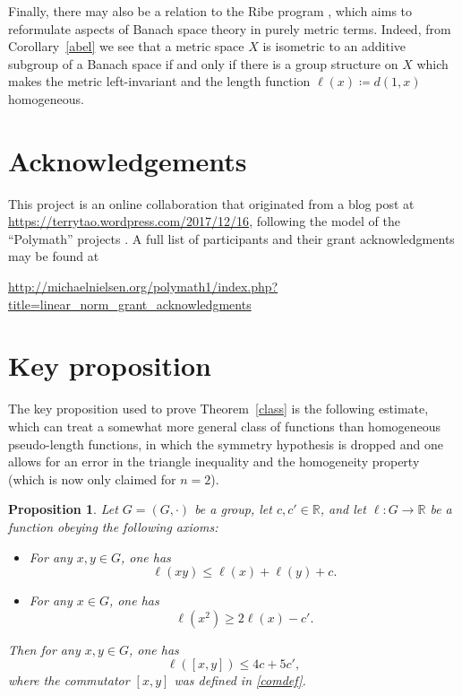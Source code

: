 \documentclass[11pt,a4paper,reqno]{amsart}
\numberwithin{equation}{section}
\theoremstyle{plain}
\newtheorem{proposition}[equation]{Proposition}
\theoremstyle{definition}
\newcommand\R{\mathbb{R}}
\newcommand\normsymb{\ell}  %
\newcommand\norm[1]{\ell({#1})}   %
\begin{document}
Finally, there may also be a relation to the Ribe program \cite{Naor},
which aims to reformulate aspects of Banach space theory in purely metric
terms. Indeed, from Corollary~\ref{abel} we see that a metric space $X$
is isometric to an additive subgroup of a Banach space if and only if
there is a group structure on $X$ which makes the metric left-invariant
and the length function $\norm{ x } \coloneqq d(1,x)$ homogeneous.


\section*{Acknowledgements}

This project is an online collaboration that originated from a blog post
at \url{https://terrytao.wordpress.com/2017/12/16}, following the model
of the ``Polymath'' projects \cite{gn}.  A full list of participants and
their grant acknowledgments may be found at
\begin{center}
\small{\url{http://michaelnielsen.org/polymath1/index.php?title=linear\_norm\_grant\_acknowledgments}}
\end{center}


\section{Key proposition}

The key proposition used to prove Theorem~\ref{class} is the following
estimate, which can treat a somewhat more general class of functions than
homogeneous pseudo-length functions, in which the symmetry hypothesis is
dropped and one allows for an error in the triangle inequality and the
homogeneity property (which is now only claimed for $n=2$).

\begin{proposition}\label{main}
Let $G = (G,\cdot)$ be a group, let $c,c' \in \R$, and let
$\normsymb: G \to \R$ be a function obeying the following axioms:
\begin{itemize}
\item[(i)]  For any $x,y \in G$, one has
\begin{equation}\label{ng}
 \norm{xy} \leq \norm{x}+\norm{y} + c.
\end{equation}
\item[(ii)]  For any $x \in G$, one has
\begin{equation}\label{double}
 \norm{x^2} \geq 2\norm{x} - c'.
\end{equation}
\end{itemize}
Then for any $x,y \in G$, one has
\begin{equation}\label{xyc}
 \norm{ [x,y] } \leq 4 c + 5 c',
\end{equation}
where the commutator $[x,y]$ was defined in \eqref{comdef}.
\end{proposition}
\end{document}
